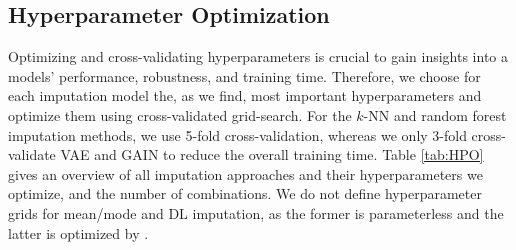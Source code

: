 \subsection{Hyperparameter Optimization}
\label{sec:HPO}
%
Optimizing and cross-validating hyperparameters is crucial to gain insights into a models' performance, robustness, and training time. Therefore, we choose for each imputation model the, as we find, most important hyperparameters and optimize them using cross-validated grid-search. For the $k$-NN and random forest imputation methods, we use 5-fold cross-validation, whereas we only 3-fold cross-validate VAE and GAIN to reduce the overall training time. Table \ref{tab:HPO} gives an overview of all imputation approaches and their hyperparameters we optimize, and the number of combinations. We do not define hyperparameter grids for mean/mode and DL imputation, as the former is parameterless and the latter is optimized by .
%
